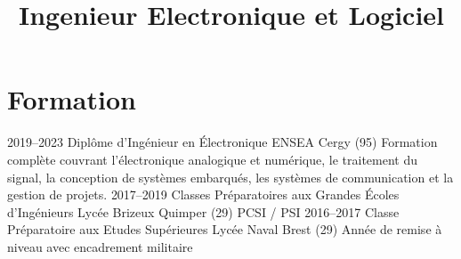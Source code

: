\documentclass[11pt,a4paper]{moderncv}
\title{Ingenieur Electronique et Logiciel}
\begin{document}
\makecvtitle

\section{Formation}
    \cventry
        {2019--2023}
        {Diplôme d'Ingénieur en Électronique}
        {ENSEA}
        {Cergy (95)}
        {}
        {Formation complète couvrant l'électronique analogique et numérique, le traitement du signal, la conception de systèmes embarqués, les systèmes de communication et la gestion de projets.}
    \cventry
        {2017--2019}
        {Classes Préparatoires aux Grandes Écoles d'Ingénieurs}
        {Lycée Brizeux}
        {Quimper (29)}
        {}
        {PCSI / PSI}   
    \cventry
        {2016--2017}
        {Classe Préparatoire aux Etudes Supérieures}
        {Lycée Naval}
        {Brest (29)}
        {}
        {Année de remise à niveau avec encadrement militaire}  

        
\end{document}

